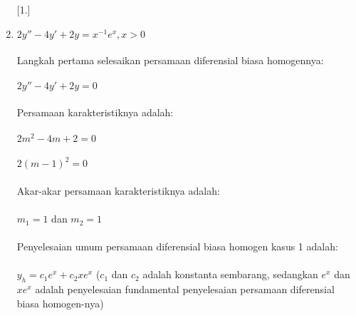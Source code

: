 \begin{enumerate} [1.]

	\item \begin{math} 2y'' - 4y' + 2y = x^{-1} e^{x}, x > 0 \end{math} \\ \\
	Langkah pertama selesaikan persamaan diferensial biasa homogennya: \\ \\
	\begin{math} 2y'' - 4y' + 2y = 0 \end{math} \\ \\
	Persamaan karakteristiknya adalah:  \\ \\
	\begin{math} 2m^{2} - 4m + 2 = 0 \end{math} \\ \\
	\begin{math} 2 (m - 1)^{2} = 0 \end{math} \\ \\
	Akar-akar persamaan karakteristiknya adalah: \\ \\
	\begin{math} m_1 = 1 \end{math} dan \begin{math} m_2 = 1 \end{math} \\ \\
	Penyelesaian umum persamaan diferensial biasa homogen kasus 1 adalah: \\ \\
	\begin{math} y_h = c_1 e^{x} + c_2 xe^{x} \end{math} (\begin{math} c_1 \end{math} dan \begin{math} c_2 \end{math} adalah konstanta sembarang, sedangkan \begin{math} e^{x} \end{math} dan \begin{math} xe^{x} \end{math} adalah penyelesaian fundamental 	penyelesaian persamaan diferensial biasa homogen-nya) \\ \\

\end{enumerate}
